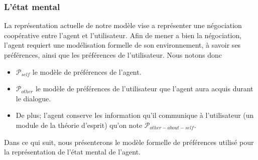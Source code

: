 \documentclass[a4paper,french]{article}
\begin{document}
\begin{figure}
	\vskip 8pt
\end{figure}

\subsubsection{L'état mental}
\par La représentation actuelle de notre modèle vise a représenter une négociation coopérative entre l'agent et l'utilisateur. Afin de mener a bien la négociation, l'agent requiert une modélisation formelle de son environnement, à savoir ses préférences, ainsi que les préférences de l'utilisateur. Nous notons donc
 \begin{itemize}
 	\item  $\mathcal{P}_{self}$ le modèle de préférences de l'agent.
 	\item $\mathcal{P}_{other}$ le modèle de préférences de l'utilisateur que l'agent aura acquis durant le dialogue.
 	\item De plus; l'agent conserve les information qu'il communique à l'utilisateur (un module de la théorie d'esprit) qu'on note $\mathcal{P}_{other-about-self}$.
 \end{itemize}

 \par Dans ce qui suit, nous présenterons le modèle formelle de préférences utilisé pour la représentation de l'état mental de l'agent.
\\
\end{document}
